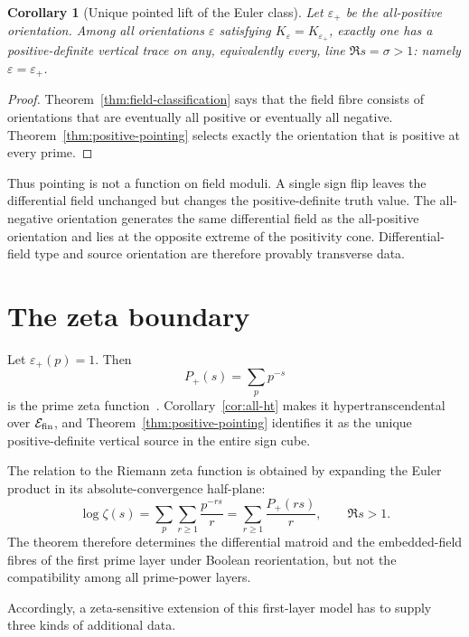 \documentclass[11pt]{article}
\newtheorem{corollary}[theorem]{Corollary}
\theoremstyle{definition}
\theoremstyle{remark}
\newcommand{\cE}{\mathcal E}
\begin{document}
\begin{corollary}[Unique pointed lift of the Euler class]\label{cor:pointed-lift}
Let \(\varepsilon_+\) be the all-positive orientation.  Among all orientations
\(\varepsilon\) satisfying \(K_\varepsilon=K_{\varepsilon_+}\), exactly one has a
positive-definite vertical trace on any, equivalently every, line \(\Re s=\sigma>1\): namely
\(\varepsilon=\varepsilon_+\).
\end{corollary}

\begin{proof}
Theorem~\ref{thm:field-classification} says that the field fibre consists of orientations that are
eventually all positive or eventually all negative.  Theorem~\ref{thm:positive-pointing} selects
exactly the orientation that is positive at every prime.
\end{proof}

Thus pointing is not a function on field moduli.  A single sign flip leaves the differential field
unchanged but changes the positive-definite truth value.  The all-negative orientation generates
the same differential field as the all-positive orientation and lies at the opposite extreme of
the positivity cone.  Differential-field type and source orientation are therefore provably
transverse data.

\section{The zeta boundary}\label{sec:zeta}

Let \(\varepsilon_+(p)=1\).  Then
\[
  P_+(s)=\sum_pp^{-s}
\]
is the prime zeta function~\cite{Froberg1968}.  Corollary~\ref{cor:all-ht} makes it
hypertranscendental over \(\cE_{\rm fin}\), and
Theorem~\ref{thm:positive-pointing} identifies it as the unique positive-definite vertical source
in the entire sign cube.

The relation to the Riemann zeta function is obtained by expanding the Euler product in its
absolute-convergence half-plane:
\begin{equation}\label{eq:euler-plethysm}
  \log\zeta(s)
  =\sum_p\sum_{r\geq1}\frac{p^{-rs}}{r}
  =\sum_{r\geq1}\frac{P_+(rs)}{r},
  \qquad \Re s>1.
\end{equation}
The theorem therefore determines the differential matroid and the embedded-field fibres of the
first prime layer under Boolean reorientation, but not the compatibility among all prime-power
layers.

Accordingly, a zeta-sensitive extension of this first-layer model has to supply three kinds of
additional data.
\end{document}
